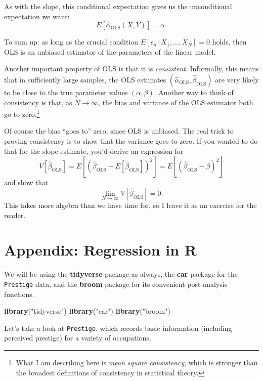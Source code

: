 \documentclass[
  12pt,
  oneside,openany]{book}
\newenvironment{Shaded}{\begin{snugshade}}{\end{snugshade}}
\newcommand{\KeywordTok}[1]{\textcolor[rgb]{0.13,0.29,0.53}{\textbf{#1}}}
\newcommand{\NormalTok}[1]{#1}
\newcommand{\StringTok}[1]{\textcolor[rgb]{0.31,0.60,0.02}{#1}}
\begin{document}
As with the slope, this conditional expectation gives us the unconditional expectation we want:
\[
E[\hat{\alpha}_{\text{OLS}}(X, Y)] = \alpha.
\]

To sum up: as long as the crucial condition \(E[\epsilon_n \,|\, X_1, \ldots, X_N] = 0\) holds, then OLS is an unbiased estimator of the parameters of the linear model.

Another important property of OLS is that it is \emph{consistent}. Informally, this means that in sufficiently large samples, the OLS estimates \((\hat{\alpha}_{\text{OLS}}, \hat{\beta}_{\text{OLS}})\) are very likely to be close to the true parameter values \((\alpha, \beta)\). Another way to think of consistency is that, as \(N \to \infty\), the bias and variance of the OLS estimator both go to zero.\footnote{What I am describing here is \emph{mean square consistency}, which is stronger than the broadest definitions of consistency in statistical theory.}

Of course the bias ``goes to'' zero, since OLS is unbiased. The real trick to proving consistency is to show that the variance goes to zero. If you wanted to do that for the slope estimate, you'd derive an expression for
\[
V[\hat{\beta}_{\text{OLS}}]
=
E[(\hat{\beta}_{\text{OLS}} - E[\hat{\beta}_{\text{OLS}}])^2]
=
E[(\hat{\beta}_{\text{OLS}} - \beta)^2]
\]
and show that
\[
\lim_{N \to \infty} V[\hat{\beta}_{\text{OLS}}] = 0.
\]
This takes more algebra than we have time for, so I leave it as an exercise for the reader.

\hypertarget{appendix-regression-in-r}{%
\section{Appendix: Regression in R}\label{appendix-regression-in-r}}

We will be using the \textbf{tidyverse} package as always, the \textbf{car} package for the \texttt{Prestige} data, and the \textbf{broom} package for its convenient post-analysis functions.

\begin{Shaded}
\begin{Highlighting}[]
\KeywordTok{library}\NormalTok{(}\StringTok{"tidyverse"}\NormalTok{)}
\KeywordTok{library}\NormalTok{(}\StringTok{"car"}\NormalTok{)}
\KeywordTok{library}\NormalTok{(}\StringTok{"broom"}\NormalTok{)}
\end{Highlighting}
\end{Shaded}

Let's take a look at \texttt{Prestige}, which records basic information (including perceived prestige) for a variety of occupations.
\end{document}
